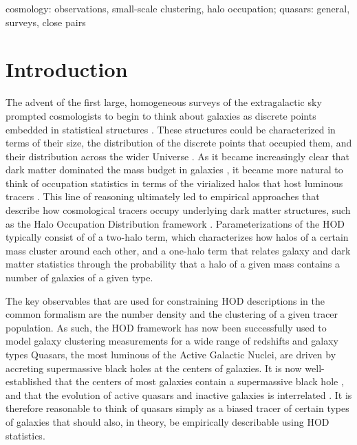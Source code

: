 \documentclass[useAMS,usenatbib]{mn2e}
\begin{document}
 \begin{keywords}
 cosmology: observations, small-scale clustering, halo occupation; quasars: general, surveys, close pairs
 \end{keywords}

\section{Introduction}
\label{intro}
The advent of the first large, homogeneous surveys of the extragalactic sky prompted
cosmologists to begin to think about galaxies as discrete points embedded in 
statistical structures \citep[e.g.][]{nsz62,ns74}. These structures could
be characterized in terms of their size, the distribution of the discrete points
that occupied them, and their distribution across the wider Universe
 \citep[see, e.g. ][for a review]{cs02}. As it became increasingly clear
 that dark matter dominated the mass budget in galaxies \citep[e.g.][]{Roo72,Ost74,Rub78}, it became more natural
 to think of occupation statistics in terms of the virialized halos that host 
 luminous tracers \citep[e.g.][]{Whi78}.
This line of reasoning ultimately led to empirical approaches that describe how 
cosmological tracers occupy underlying dark matter structures, such as the Halo 
Occupation Distribution framework \citep[HOD; e.g., ][and references therein]{bw02,zh07}.
Parameterizations of the HOD typically consist of of a two-halo term, which characterizes how halos of a certain
mass cluster around each other, and a one-halo term that relates galaxy and dark matter statistics through the
probability that a halo of a given mass contains a number of galaxies of a given
type. 

The key observables that are used for constraining HOD descriptions in the common formalism
are the number density and the clustering of a given tracer population. 
As such, the HOD framework has now been successfully used to model galaxy
clustering measurements for a wide range of redshifts and galaxy
types \citep[e.g.,][]{2dFsurv,daw16}
Quasars, the most luminous of the Active Galactic Nuclei, are driven by accreting
supermassive black holes at the centers of galaxies. It is now well-established that the centers of most galaxies 
contain a supermassive black hole \citep[e.g.][]{Kor95}, and that the evolution of active quasars and inactive 
galaxies is interrelated \citep[e.g.][]{Kau00}. It is therefore reasonable to think of quasars simply as a biased tracer
of certain types of galaxies that should also, in theory, be empirically describable using HOD statistics.
\end{document}
